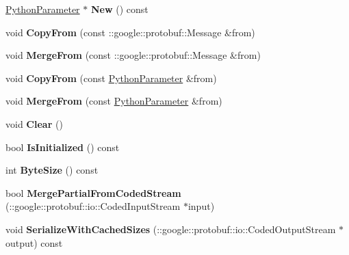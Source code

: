 \begin{DoxyCompactItemize}
\mbox{\hyperlink{classcaffe_1_1_python_parameter}{Python\+Parameter}} $\ast$ {\bfseries New} () const
\item 
\mbox{\label{classcaffe_1_1_python_parameter_a178a54a47c4bb365928c752997836054}} 
void {\bfseries Copy\+From} (const \+::google\+::protobuf\+::\+Message \&from)
\item 
\mbox{\label{classcaffe_1_1_python_parameter_a62968e5e21a6f81bf03c50832851d42b}} 
void {\bfseries Merge\+From} (const \+::google\+::protobuf\+::\+Message \&from)
\item 
\mbox{\label{classcaffe_1_1_python_parameter_a52671b387b8149a0c17d22586c607451}} 
void {\bfseries Copy\+From} (const \mbox{\hyperlink{classcaffe_1_1_python_parameter}{Python\+Parameter}} \&from)
\item 
\mbox{\label{classcaffe_1_1_python_parameter_ae8893d93c497f6d267af486d51bae3e8}} 
void {\bfseries Merge\+From} (const \mbox{\hyperlink{classcaffe_1_1_python_parameter}{Python\+Parameter}} \&from)
\item 
\mbox{\label{classcaffe_1_1_python_parameter_a93d6630b4decce34bc7388d5f6ebc0df}} 
void {\bfseries Clear} ()
\item 
\mbox{\label{classcaffe_1_1_python_parameter_a19b5e36d6c8fa13e1c83b9a8957b83f2}} 
bool {\bfseries Is\+Initialized} () const
\item 
\mbox{\label{classcaffe_1_1_python_parameter_a6c28511ca28c4a70bb7aa3bd1e4a95d9}} 
int {\bfseries Byte\+Size} () const
\item 
\mbox{\label{classcaffe_1_1_python_parameter_ae2c5544258fbda1598ea32a25b14bd89}} 
bool {\bfseries Merge\+Partial\+From\+Coded\+Stream} (\+::google\+::protobuf\+::io\+::\+Coded\+Input\+Stream $\ast$input)
\item 
\mbox{\label{classcaffe_1_1_python_parameter_acb0583e5e3de3bc28ef7bee1b3cf72ac}} 
void {\bfseries Serialize\+With\+Cached\+Sizes} (\+::google\+::protobuf\+::io\+::\+Coded\+Output\+Stream $\ast$output) const

\end{DoxyCompactItemize}
